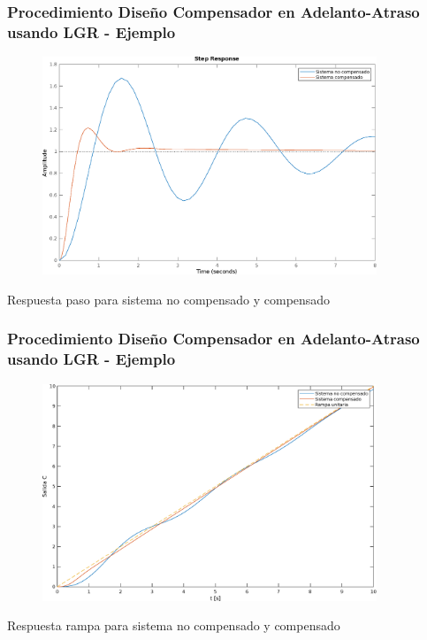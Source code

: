 \documentclass[aspectratio=169,handout]{beamer}
\theoremstyle{definition}
\theoremstyle{plain}
\theoremstyle{remark}
\begin{document}
\begin{frame}[<+->]\frametitle{Procedimiento Diseño Compensador en Adelanto-Atraso usando LGR - Ejemplo}
	\begin{figure}
		\includegraphics[width=10cm]{images/ejemplo3_comparacion_paso.eps}
	\end{figure}
	\vspace*{-5mm}
	\centering \footnotesize Respuesta paso para sistema no compensado y compensado
\end{frame}

\begin{frame}[<+->]\frametitle{Procedimiento Diseño Compensador en Adelanto-Atraso usando LGR - Ejemplo}
	\begin{figure}
		\includegraphics[width=10cm]{images/ejemplo3_comparacion_rampa.eps}
	\end{figure}
	\vspace*{-5mm}
	\centering \footnotesize Respuesta rampa para sistema no compensado y compensado
\end{frame}
\end{document}
